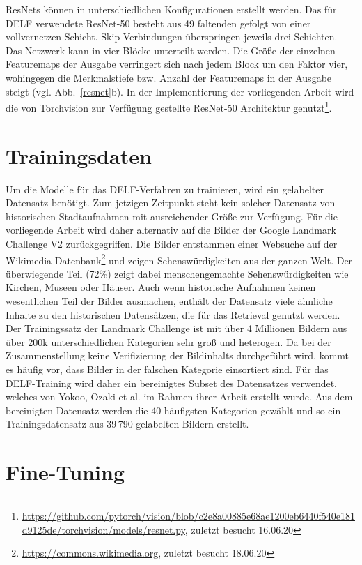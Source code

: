 ResNets können in unterschiedlichen Konfigurationen erstellt werden. Das für DELF verwendete \mbox{ResNet-50} besteht aus 49 faltenden gefolgt von einer vollvernetzen Schicht. Skip-Verbindungen überspringen jeweils drei Schichten. Das Netzwerk kann in vier Blöcke unterteilt werden. Die Größe der einzelnen Featuremaps der Ausgabe verringert sich nach jedem Block um den Faktor vier, wohingegen die Merkmalstiefe bzw. Anzahl der Featuremaps in der Ausgabe steigt (vgl. Abb.~\ref{resnet}b). In der Implementierung der vorliegenden Arbeit wird die von Torchvision zur Verfügung gestellte ResNet-50 Architektur genutzt\footnote{\url{https://github.com/pytorch/vision/blob/c2e8a00885e68ae1200eb6440f540e181d9125de/torchvision/models/resnet.py}, zuletzt besucht 16.06.20}. 


\section{Trainingsdaten}\label{trainingsdata}
Um die Modelle für das DELF-Verfahren zu trainieren, wird ein gelabelter Datensatz benötigt. Zum jetzigen Zeitpunkt steht kein solcher Datensatz von historischen Stadtaufnahmen mit ausreichender Größe zur Verfügung. Für die vorliegende Arbeit wird daher alternativ auf die Bilder der Google Landmark Challenge V2 \cite{landmarks_v2} zurückgegriffen. Die Bilder entstammen einer Websuche auf der Wikimedia Datenbank\footnote{\url{https://commons.wikimedia.org}, zuletzt besucht 18.06.20} und zeigen Sehenswürdigkeiten aus der ganzen Welt. Der überwiegende Teil (72\%) zeigt dabei menschengemachte Sehenswürdigkeiten wie Kirchen, Museen oder Häuser. Auch wenn historische Aufnahmen keinen wesentlichen Teil der Bilder ausmachen, enthält der Datensatz viele ähnliche Inhalte zu den historischen Datensätzen, die für das Retrieval genutzt werden. Der Trainingssatz der Landmark Challenge ist mit über 4 Millionen Bildern aus über 200k unterschiedlichen Kategorien sehr groß und heterogen. Da bei der Zusammenstellung keine Verifizierung der Bildinhalts durchgeführt wird, kommt es häufig vor, dass Bilder in der falschen Kategorie einsortiert sind. Für das DELF-Training wird daher ein bereinigtes Subset des Datensatzes verwendet, welches von Yokoo, Ozaki et al. im Rahmen ihrer Arbeit \cite{landmarks_verified} erstellt wurde. Aus dem bereinigten Datensatz werden die 40 häufigsten Kategorien gewählt und so ein Trainingsdatensatz aus 39\,790 gelabelten Bildern erstellt. 

\section{Fine-Tuning}

